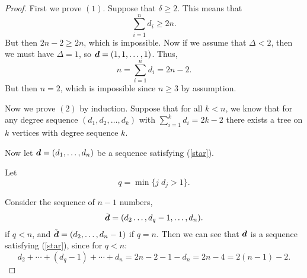 \documentclass{unswmaths}
\begin{document}
\begin{proof}
    First we prove $(1)$. Suppose that $\delta \geq 2$. This means that
    \begin{equation}
        \sum_{i=1}^n d_i \geq 2n.
    \end{equation}
    But then $2n-2 \geq 2n$, which is impossible. Now if we assume that $\Delta < 2$,
    then we must have $\Delta = 1$, so $\boldsymbol{d} = (1,1,\ldots,1)$. Thus,
    \begin{equation}
        n = \sum_{i=1}^n d_i = 2n-2.
    \end{equation}
    But then $n = 2$, which is impossible since $n \geq 3$ by assumption.
    
    Now we prove $(2)$ by induction. Suppose that for all $k < n$, we know
    that for any degree sequence $(d_1,d_2,\ldots,d_k)$ with $\sum_{i=1}^k d_i = 2k-2$
    there exists a tree on $k$ vertices with degree sequence $k$.
    
    Now let $\boldsymbol{d} = (d_1,\ldots,d_n)$ be a sequence satisfying (\ref{star}).
    
    Let
    \begin{equation}
        q = \min\{ j \; d_j > 1\}.
    \end{equation}
%            
    
    Consider
    the sequence of $n-1$ numbers,
    \begin{equation}
        \tilde{\boldsymbol{d}} = (d_2\ldots,d_q-1,\ldots,d_n).
    \end{equation}
    if $q < n$, and $\tilde{\boldsymbol{d}} = (d_2,\ldots,d_n-1)$ if $q = n$.
    Then we can see that $\boldsymbol{d}$ is a sequence satisfying (\ref{star}), since
    for $q < n$:
    \begin{equation}
        d_2+\cdots+(d_q-1) + \cdots + d_n = 2n-2-1-d_n = 2n-4 = 2(n-1) - 2.
    \end{equation}
    

\end{proof}
\end{document}
